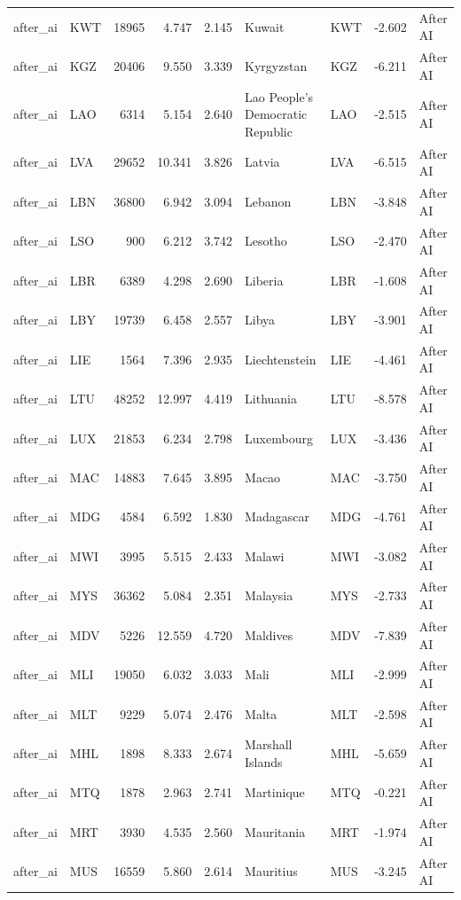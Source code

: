 \begin{tabular}{llrrrllrl}
after\_ai & KWT & 18965 & 4.747 & 2.145 & Kuwait & KWT & -2.602 & After AI \\
after\_ai & KGZ & 20406 & 9.550 & 3.339 & Kyrgyzstan & KGZ & -6.211 & After AI \\
after\_ai & LAO & 6314 & 5.154 & 2.640 & Lao People's Democratic Republic & LAO & -2.515 & After AI \\
after\_ai & LVA & 29652 & 10.341 & 3.826 & Latvia & LVA & -6.515 & After AI \\
after\_ai & LBN & 36800 & 6.942 & 3.094 & Lebanon & LBN & -3.848 & After AI \\
after\_ai & LSO & 900 & 6.212 & 3.742 & Lesotho & LSO & -2.470 & After AI \\
after\_ai & LBR & 6389 & 4.298 & 2.690 & Liberia & LBR & -1.608 & After AI \\
after\_ai & LBY & 19739 & 6.458 & 2.557 & Libya & LBY & -3.901 & After AI \\
after\_ai & LIE & 1564 & 7.396 & 2.935 & Liechtenstein & LIE & -4.461 & After AI \\
after\_ai & LTU & 48252 & 12.997 & 4.419 & Lithuania & LTU & -8.578 & After AI \\
after\_ai & LUX & 21853 & 6.234 & 2.798 & Luxembourg & LUX & -3.436 & After AI \\
after\_ai & MAC & 14883 & 7.645 & 3.895 & Macao & MAC & -3.750 & After AI \\
after\_ai & MDG & 4584 & 6.592 & 1.830 & Madagascar & MDG & -4.761 & After AI \\
after\_ai & MWI & 3995 & 5.515 & 2.433 & Malawi & MWI & -3.082 & After AI \\
after\_ai & MYS & 36362 & 5.084 & 2.351 & Malaysia & MYS & -2.733 & After AI \\
after\_ai & MDV & 5226 & 12.559 & 4.720 & Maldives & MDV & -7.839 & After AI \\
after\_ai & MLI & 19050 & 6.032 & 3.033 & Mali & MLI & -2.999 & After AI \\
after\_ai & MLT & 9229 & 5.074 & 2.476 & Malta & MLT & -2.598 & After AI \\
after\_ai & MHL & 1898 & 8.333 & 2.674 & Marshall Islands & MHL & -5.659 & After AI \\
after\_ai & MTQ & 1878 & 2.963 & 2.741 & Martinique & MTQ & -0.221 & After AI \\
after\_ai & MRT & 3930 & 4.535 & 2.560 & Mauritania & MRT & -1.974 & After AI \\
after\_ai & MUS & 16559 & 5.860 & 2.614 & Mauritius & MUS & -3.245 & After AI \\

\end{tabular}
